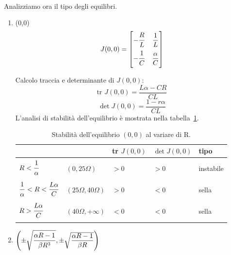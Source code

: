 Analizziamo ora il tipo degli equilibri.
\begin{enumerate}
\item (0,0)\\
\begin{equation}
    J(0,0) =
    \begin{bmatrix}
    -\dfrac{\strut R}{L\strut} & \dfrac{1}{L} \\
    -\dfrac{\strut 1}{C\strut} & \dfrac{\alpha}{C} \\
    \end{bmatrix}
\end{equation}

Calcolo traccia e determinante di $J(0,0)$:
\begin{equation}
\textrm{tr } J(0,0) = \frac{L\alpha-CR}{CL}
\end{equation}
\begin{equation}
\det J(0,0) = \frac{1-r\alpha}{CL}
\end{equation}
L'analisi di stabilità dell'equilibrio è mostrata nella tabella~\ref{stab-00}.

\begin{table}[h]
    \begin{center}
    \begin{tabular}{l l l l l}
        & & tr $J(0,0)$ & $\det J(0,0)$ & tipo\\
        \hline
        $R<\dfrac{1\strut}{\alpha\strut}$ & $(0, 25 \Omega)$ & $>0$ & $>0$ & instabile \\
        \hline
        $\dfrac{1\strut}{\alpha\strut}<R<\dfrac{L\alpha}{C}$ & $(25 \Omega, 40 \Omega)$ & $>0$ & $<0$ & sella \\
        \hline
        $R>\dfrac{L\alpha\strut}{C\strut}$ & $(40 \Omega, +\infty)$ & $<0$ & $<0$ & sella \\
        \hline
    \end{tabular}
    \caption{Stabilità dell'equilibrio $(0,0)$ al variare di R.}
    \label{stab-00}
    \end{center}
\end{table}

\item $\left( \pm \sqrt{\dfrac{\strut\alpha R -1}{\strut\beta R^3}}, \pm \sqrt{\dfrac{\alpha R -1}{\beta R}} \right)$


\end{enumerate}
